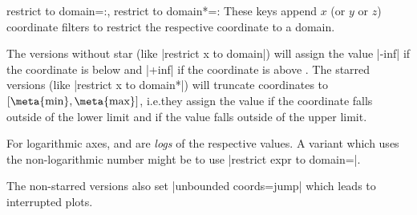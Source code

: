 \begin{pgfplotsxykeylist}{%
    restrict \x\space to domain=:,
    restrict \x\space to domain*=:%
}
\label{key:restrict:x:to:domain}
    These keys append $x$ (or $y$ or $z$) coordinate filters to restrict the
    respective coordinate to a domain.


    The versions without star (like |restrict x to domain|) will assign the
    value |-inf| if the coordinate is below  and |+inf| if the
    coordinate is above . The starred versions (like
    |restrict x to domain*|) will truncate coordinates to $[\hbox{\meta{min}},
    \hbox{\meta{max}}]$, i.e.\@ they assign the value  if the
    coordinate falls outside of the lower limit and  if the value
    falls outside of the upper limit.

    For logarithmic axes,  and  are \emph{logs} of the
    respective values. A variant which uses the non-logarithmic number might be
    to use |restrict expr to domain={\pgfmathrawx}|.

    The non-starred versions also set |unbounded coords=jump| which leads to
    interrupted plots.
\pgfplotsexpensiveexample
\begin{codeexample}[]
\end{codeexample}
\end{pgfplotsxykeylist}

